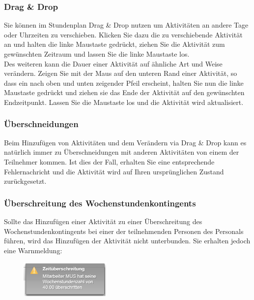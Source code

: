 \documentclass[fontsize=12pt]{scrartcl}
\begin{document}
\subsubsection{Drag \& Drop}
Sie können im Stundenplan Drag \& Drop nutzen um Aktivitäten an andere Tage oder Uhrzeiten zu verschieben. Klicken Sie dazu die zu verschiebende Aktivität an und halten die linke Maustaste gedrückt, ziehen Sie die Aktivität zum gewünschten Zeitraum und lassen Sie die linke Maustaste los.\\
Des weiteren kann die Dauer einer Aktivität auf ähnliche Art und Weise verändern. Zeigen Sie mit der Maus auf den unteren Rand einer Aktivität, so dass ein nach oben und unten zeigender Pfeil erscheint, halten Sie nun die linke Maustaste gedrückt und ziehen sie das Ende der Aktivität auf den gewünschten Endzeitpunkt. Lassen Sie die Maustaste los und die Aktivität wird aktualisiert. \\

\subsubsection{Überschneidungen}
Beim Hinzufügen von Aktivitäten und dem Verändern via Drag \& Drop kann es natürlich immer zu Überschneidungen mit anderen Aktivitäten von einem der Teilnehmer kommen. Ist dies der Fall, erhalten Sie eine entsprechende Fehlernachricht und die Aktivität wird auf Ihren ursprünglichen Zustand zurückgesetzt.

\subsubsection{Überschreitung des Wochenstundenkontingents}
Sollte das Hinzufügen einer Aktivität zu einer Überschreitung des Wochenstundenkontingents bei einer der teilnehmenden Personen des Personals führen, wird das Hinzufügen der Aktivität nicht unterbunden. Sie erhalten jedoch eine Warnmeldung: 

\begin{figure}[H]
\centering
\includegraphics[width=0.4\textwidth]{images/warning.png}
\end{figure}
\end{document}
